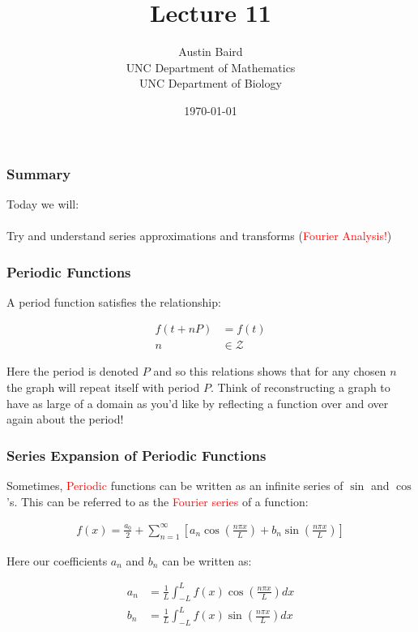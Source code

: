 \documentclass[serif]{beamer}
\title{Lecture 11}
\author{Austin Baird\\UNC Department of Mathematics\\UNC Department of Biology}
\date{\today}
\begin{document}
\frame{\titlepage}

\begin{frame}
\frametitle{Summary}

Today we will: 
\ \\
\ \\
Try and understand series approximations and transforms (\textcolor{red}{Fourier Analysis!}) 
\end{frame}

\begin{frame}
\frametitle{Periodic Functions}

A period function satisfies the relationship: 

\begin{align*}
f(t+nP) &= f(t)\\
n &\in \mathcal{Z}
\end{align*}

Here the period is denoted $P$ and so this relations shows that for any chosen $n$ the graph will repeat itself with period $P$. Think of reconstructing a graph to have as large of a domain as you'd like by reflecting a function over and over again about the period!


\end{frame}

\begin{frame}

\frametitle{Series Expansion of Periodic Functions} 

Sometimes, \textcolor{red}{Periodic} functions can be written as an infinite series of $\sin$ and $\cos$'s. This can be referred to as the \textcolor{red}{Fourier series} of a function: 

\begin{align*}
f(x) = \frac{a_0}{2} + \sum^{\infty}_{n=1}[a_n\cos\left(\frac{n\pi x}{L}\right) + b_n\sin\left(\frac{n\pi x}{L}\right)]
\end{align*}

Here our coefficients $a_n$ and $b_n$ can be written as: 

\begin{align*}
a_n &= \frac{1}{L} \int^{L}_{-L} f(x)\cos \left(\frac{n\pi x}{L}\right) dx \\
b_n &= \frac{1}{L} \int^{L}_{-L} f(x)\sin \left(\frac{n\pi x}{L}\right) dx 
\end{align*}

\end{frame}
\end{document}
